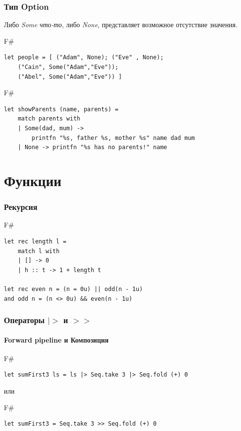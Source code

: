 \documentclass[xetex,mathserif,serif]{beamer}
\begin{document}
	\begin{frame}[fragile]
		\frametitle{Тип Option}
		Либо \textit{Some что-то}, либо \textit{None}, представляет возможное отсутствие значения.
		\begin{exampleblock}{F\#}
			\begin{lstlisting}
let people = [ ("Adam", None); ("Eve" , None);
    ("Cain", Some("Adam","Eve"));
    ("Abel", Some("Adam","Eve")) ]
            \end{lstlisting}
		\end{exampleblock}
		\begin{exampleblock}{F\#}
			\begin{lstlisting}
let showParents (name, parents) =
    match parents with
    | Some(dad, mum) -> 
        printfn "%s, father %s, mother %s" name dad mum
    | None -> printfn "%s has no parents!" name
            \end{lstlisting}
		\end{exampleblock}
\end{frame}

	\section{Функции}

	\begin{frame}[fragile]
		\frametitle{Рекурсия}
		\begin{exampleblock}{F\#}
			\begin{lstlisting}
let rec length l =
    match l with
    | [] -> 0
    | h :: t -> 1 + length t

let rec even n = (n = 0u) || odd(n - 1u)
and odd n = (n <> 0u) && even(n - 1u)			
            \end{lstlisting}
		\end{exampleblock}
\end{frame}

	\begin{frame}[fragile]
		\frametitle{Операторы $|>$ и $>>$}
		\framesubtitle{Forward pipeline и Композиция}
		\begin{exampleblock}{F\#}
			\begin{lstlisting}
let sumFirst3 ls = ls |> Seq.take 3 |> Seq.fold (+) 0
            \end{lstlisting}
        \end{exampleblock}
        или
		\begin{exampleblock}{F\#}
			\begin{lstlisting}
let sumFirst3 = Seq.take 3 >> Seq.fold (+) 0
            \end{lstlisting}
		\end{exampleblock}
\end{frame}
\end{document}
